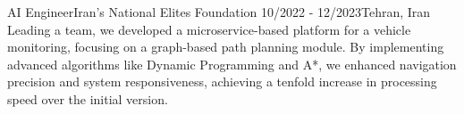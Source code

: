 \resumeSubheadingReza
{AI Engineer}{Iran's National Elites Foundation}
{10/2022 - 12/2023}{Tehran, Iran}
 {Leading a team, we developed a microservice-based platform for a vehicle monitoring, focusing on a graph-based path planning module. By implementing advanced algorithms like Dynamic Programming and A*, we enhanced navigation precision and system responsiveness, achieving a tenfold increase in processing speed over the initial version.}
